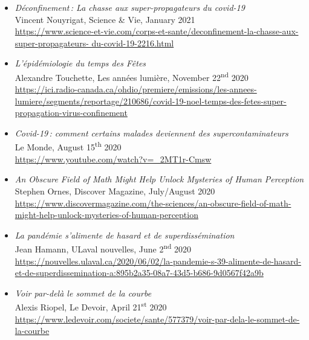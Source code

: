 \documentclass[11pt]{article}
\begin{document}
\begin{itemize}[itemsep=0.5em, first*=\small]
%
  \item \parbox[t]{0.9\textwidth}{\textit{Déconfinement\,: La chasse aux super-propagateurs du covid-19}\\
  {\small Vincent Nouyrigat, Science \& Vie, January 2021}\\
  \footnotesize\url{https://www.science-et-vie.com/corps-et-sante/deconfinement-la-chasse-aux-super-propagateurs- du-covid-19-2216.html}}
%
  \item \parbox[t]{0.9\textwidth}{\textit{L'épidémiologie du temps des Fêtes}\\
  {\small Alexandre Touchette, Les années lumière, November 22\textsuperscript{nd} 2020}\\
  \footnotesize\url{https://ici.radio-canada.ca/ohdio/premiere/emissions/les-annees-lumiere/segments/reportage/210686/covid-19-noel-temps-des-fetes-super-propagation-virus-confinement}}
%
  \item \parbox[t]{0.9\textwidth}{\textit{Covid-19\,: comment certains malades deviennent des supercontaminateurs}\\
  {\small Le Monde, August 15\textsuperscript{th} 2020}\\
  \footnotesize\url{https://www.youtube.com/watch?v=_2MT1r-Cmsw}}
%
  \item \parbox[t]{0.9\textwidth}{\textit{An Obscure Field of Math Might Help Unlock Mysteries of Human Perception}\\
  {\small Stephen Ornes, Discover Magazine, July/August 2020}\\
  \footnotesize\url{https://www.discovermagazine.com/the-sciences/an-obscure-field-of-math-might-help-unlock-mysteries-of-human-perception}}
%
  \item \parbox[t]{0.9\textwidth}{\textit{La pandémie s'alimente de hasard et de superdissémination}\\
  {\small Jean Hamann, ULaval nouvelles, June 2\textsuperscript{nd} 2020}\\
  \footnotesize\url{https://nouvelles.ulaval.ca/2020/06/02/la-pandemie-s-39-alimente-de-hasard-et-de-superdissemination-a:895b2a35-08a7-43d5-b686-9d0567f42a9b}}
%
  \item \parbox[t]{0.9\textwidth}{\textit{Voir par-delà le sommet de la courbe}\\
  {\small Alexis Riopel, Le Devoir, April 21\textsuperscript{st} 2020}\\
  \footnotesize\url{https://www.ledevoir.com/societe/sante/577379/voir-par-dela-le-sommet-de-la-courbe}}

\end{itemize}
\end{document}
